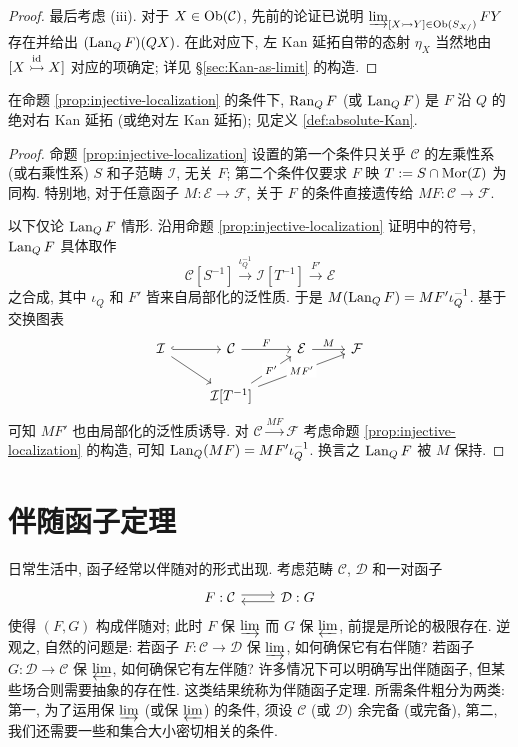 \begin{proof}
	最后考虑 (iii). 对于 $X \in \operatorname{Ob}(\mathcal{C})$, 先前的论证已说明 $\varinjlim_{[X \rightarrowtail Y] \in \operatorname{Ob}(S_{X/})} FY$ 存在并给出 $(\operatorname{Lan}_Q F)(QX)$. 在此对应下, 左 Kan 延拓自带的态射 $\eta_X$ 当然地由 $[X \stackrel{\mathrm{id}}{\rightarrowtail} X]$ 对应的项确定; 详见 \S\ref{sec:Kan-as-limit} 的构造.
\end{proof}

\begin{proposition}\label{prop:localization-functor-abs}
	在命题 \ref{prop:injective-localization} 的条件下, $\operatorname{Ran}_Q F$ (或 $\operatorname{Lan}_Q F$) 是 $F$ 沿 $Q$ 的绝对右 Kan 延拓 (或绝对左 Kan 延拓); 见定义 \ref{def:absolute-Kan}.
\end{proposition}
\begin{proof}
	命题 \ref{prop:injective-localization} 设置的第一个条件只关乎 $\mathcal{C}$ 的左乘性系 (或右乘性系) $S$ 和子范畴 $\mathcal{I}$, 无关 $F$; 第二个条件仅要求 $F$ 映 $T := S \cap \operatorname{Mor}(\mathcal{I})$ 为同构. 特别地, 对于任意函子 $M: \mathcal{E} \to \mathcal{F}$, 关于 $F$ 的条件直接遗传给 $MF: \mathcal{C} \to \mathcal{F}$.
	
	以下仅论 $\operatorname{Lan}_Q F$ 情形. 沿用命题 \ref{prop:injective-localization} 证明中的符号, $\operatorname{Lan}_Q F$ 具体取作
	\[ \mathcal{C}[S^{-1}] \xrightarrow{\iota_Q^{-1}} \mathcal{I}[T^{-1}] \xrightarrow{F'} \mathcal{E} \]
	之合成, 其中 $\iota_Q$ 和 $F'$ 皆来自局部化的泛性质. 于是 $M (\operatorname{Lan}_Q F) = MF' \iota_Q^{-1}$. 基于交换图表
	\[\begin{tikzcd}
		\mathcal{I} \arrow[hookrightarrow, r] \arrow[rd] & \mathcal{C} \arrow[r, "F"] & \mathcal{E} \arrow[r, "M"] & \mathcal{F} \\
		& \mathcal{I}[T^{-1}] \arrow[ru, "{F'}" description] \arrow[rru, "{MF'}" description] & &
	\end{tikzcd}\]
	可知 $MF'$ 也由局部化的泛性质诱导. 对 $\mathcal{C} \xrightarrow{MF} \mathcal{F}$ 考虑命题 \ref{prop:injective-localization} 的构造, 可知 $\operatorname{Lan}_Q (MF) = MF' \iota_Q^{-1}$. 换言之 $\operatorname{Lan}_Q F$ 被 $M$ 保持.
\end{proof}

\section{伴随函子定理}\label{sec:AFT}
日常生活中, 函子经常以伴随对的形式出现. 考虑范畴 $\mathcal{C}$, $\mathcal{D}$ 和一对函子
\[\begin{tikzcd}
	F: \mathcal{C} \arrow[shift left, r] & \mathcal{D}: G \arrow[shift left, l]
\end{tikzcd}\]
使得 $(F, G)$ 构成伴随对; 此时 $F$ 保 $\varinjlim$ 而 $G$ 保 $\varprojlim$, 前提是所论的极限存在. 逆观之, 自然的问题是: 若函子 $F: \mathcal{C} \to \mathcal{D}$ 保 $\varinjlim$, 如何确保它有右伴随? 若函子 $G: \mathcal{D} \to \mathcal{C}$ 保 $\varprojlim$, 如何确保它有左伴随? 许多情况下可以明确写出伴随函子, 但某些场合则需要抽象的存在性. 这类结果统称为伴随函子定理. 所需条件粗分为两类: 第一, 为了运用保 $\varinjlim$ (或保 $\varprojlim$) 的条件, 须设 $\mathcal{C}$ (或 $\mathcal{D}$) 余完备 (或完备), 第二, 我们还需要一些和集合大小密切相关的条件.

